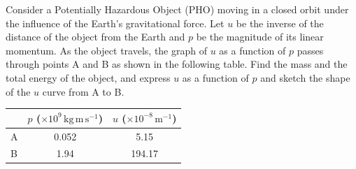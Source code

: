 Consider a Potentially Hazardous Object (PHO) moving in a closed orbit under
the influence of the Earth's gravitational force. Let $u$ be the inverse of the
distance of the object from the Earth and $p$ be the magnitude of its linear
momentum. As the object travels, the graph of $u$ as a function of $p$ passes
through points A and B as shown in the following table. Find the mass and the
total energy of the object, and express $u$ as a function of $p$ and sketch the
shape of the $u$ curve from A to B.

\begin{center}
\begin{tabular}{lcc}
\toprule
 & $p$ ($\times 10^{9}$\,$\mathrm{kg\,m\,s^{-1}}$)
 & $u$ ($\times 10^{-8}$\,$\mathrm{m^{-1}}$) \\
\midrule
A & 0.052 & 5.15 \\
B & 1.94 & 194.17 \\
\bottomrule
\end{tabular}
\end{center}
